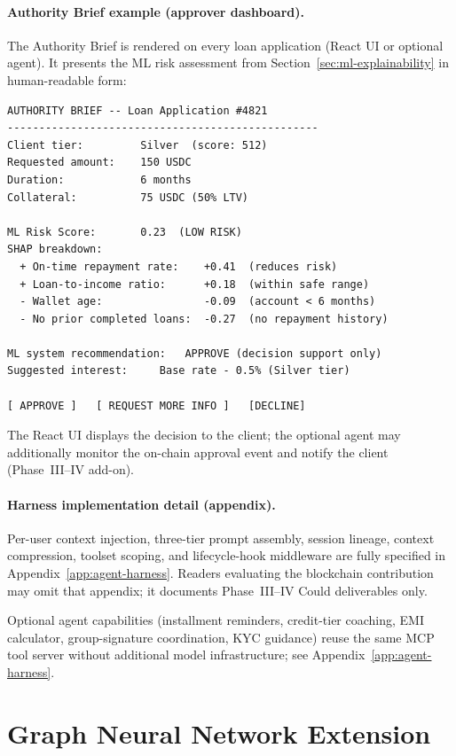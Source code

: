 \documentclass[12pt, a4paper]{report}
\begin{document}
\paragraph{Authority Brief example (approver dashboard).}

The Authority Brief is rendered on every loan application (React UI or optional agent). It presents the ML risk assessment from Section~\ref{sec:ml-explainability} in human-readable form:

\begin{verbatim}
AUTHORITY BRIEF -- Loan Application #4821
-------------------------------------------------
Client tier:         Silver  (score: 512)
Requested amount:    150 USDC
Duration:            6 months
Collateral:          75 USDC (50% LTV)

ML Risk Score:       0.23  (LOW RISK)
SHAP breakdown:
  + On-time repayment rate:    +0.41  (reduces risk)
  + Loan-to-income ratio:      +0.18  (within safe range)
  - Wallet age:                -0.09  (account < 6 months)
  - No prior completed loans:  -0.27  (no repayment history)

ML system recommendation:   APPROVE (decision support only)
Suggested interest:     Base rate - 0.5% (Silver tier)

[ APPROVE ]   [ REQUEST MORE INFO ]   [DECLINE]
\end{verbatim}

\noindent The React UI displays the decision to the client; the optional agent may additionally monitor the on-chain approval event and notify the client (Phase~III--IV add-on).

\paragraph{Harness implementation detail (appendix).}
Per-user context injection, three-tier prompt assembly, session lineage, context compression, toolset scoping, and lifecycle-hook middleware are fully specified in Appendix~\ref{app:agent-harness}. Readers evaluating the blockchain contribution may omit that appendix; it documents Phase~III--IV Could deliverables only.

\noindent Optional agent capabilities (installment reminders, credit-tier coaching, EMI calculator, group-signature coordination, KYC guidance) reuse the same MCP tool server without additional model infrastructure; see Appendix~\ref{app:agent-harness}.

\section{Graph Neural Network Extension}
\label{sec:gnn-extension}
\end{document}
